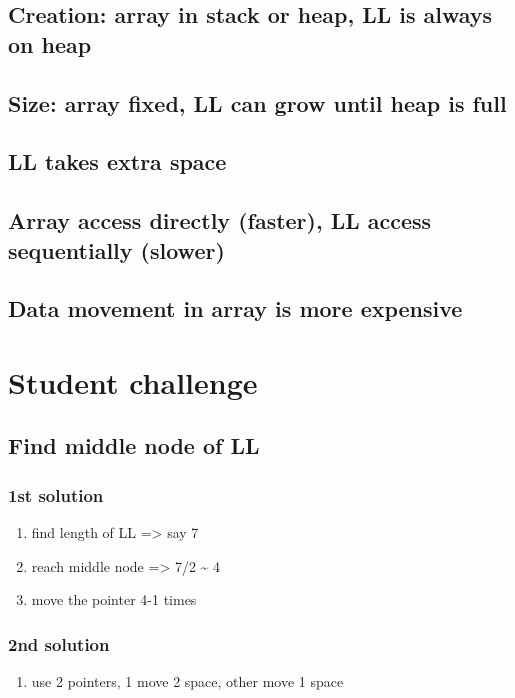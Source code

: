 \documentclass[11pt]{article}
\begin{document}
\subsection{Creation: array in stack or heap, LL is always on heap}
\label{sec:org91664ed}
\subsection{Size: array fixed, LL can grow until heap is full}
\label{sec:org2735d81}
\subsection{LL takes extra space}
\label{sec:org12eaf87}
\subsection{Array access directly (faster), LL access sequentially (slower)}
\label{sec:org8648808}
\subsection{Data movement in array is more expensive}
\label{sec:org77f3087}
\section{Student challenge}
\label{sec:org9ce48c7}
\subsection{Find middle node of LL}
\label{sec:org1859bc3}
\subsubsection{1st solution}
\label{sec:org43d2c11}
\begin{enumerate}
\item find length of LL => say 7
\label{sec:org9c7e133}
\item reach middle node => 7/2 \textasciitilde{} 4
\label{sec:orga1ee2a1}
\item move the pointer 4-1 times
\label{sec:orga9cc77e}
\end{enumerate}
\subsubsection{2nd solution}
\label{sec:orgcd2f2fa}
\begin{enumerate}
\item use 2 pointers, 1 move 2 space, other move 1 space
\label{sec:orgd983d03}
\end{enumerate}
\end{document}
